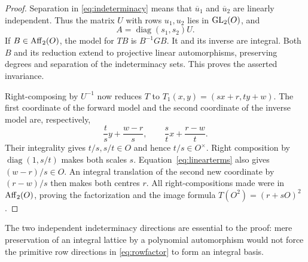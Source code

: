 \begin{proof}
Separation in \eqref{eq:indeterminacy} means that $\overline u_1$ and
$\overline u_2$ are linearly independent. Thus the matrix $U$ with
rows $u_1,u_2$ lies in $\operatorname{GL}_2(O)$, and
\begin{equation}\label{eq:rowfactor}
 A=\operatorname{diag}(s_1,s_2)U.
\end{equation}
If $B\in\operatorname{Aff}_2(O)$, the model for $TB$ is $B^{-1}GB$. It and its
inverse are integral. Both $B$ and its reduction extend to projective
linear automorphisms, preserving degrees and separation of the
indeterminacy sets. This proves the asserted invariance.

Right-composing by $U^{-1}$ now reduces $T$ to
$T_1(x,y)=(sx+r,ty+w)$. The first coordinate of the forward model
and the second coordinate of the inverse model are, respectively,
\begin{equation}\label{eq:linearterms}
 \frac ts y+\frac{w-r}{s},\qquad
 \frac st x+\frac{r-w}{t}.
\end{equation}
Their integrality gives $t/s,s/t\in O$ and hence $t/s\in O^\times$.
Right composition by $\operatorname{diag}(1,s/t)$ makes both scales
$s$. Equation~\eqref{eq:linearterms} also gives $(w-r)/s\in O$.
An integral translation of the second new coordinate by $(r-w)/s$
then makes both centres $r$. All right-compositions made were in
$\operatorname{Aff}_2(O)$, proving the factorization and the image formula
$T(O^2)=(r+sO)^2$.
\end{proof}

The two independent indeterminacy directions are essential to the
proof: mere preservation of an integral lattice by a polynomial
automorphism would not force the primitive row directions in
\eqref{eq:rowfactor} to form an integral basis.
